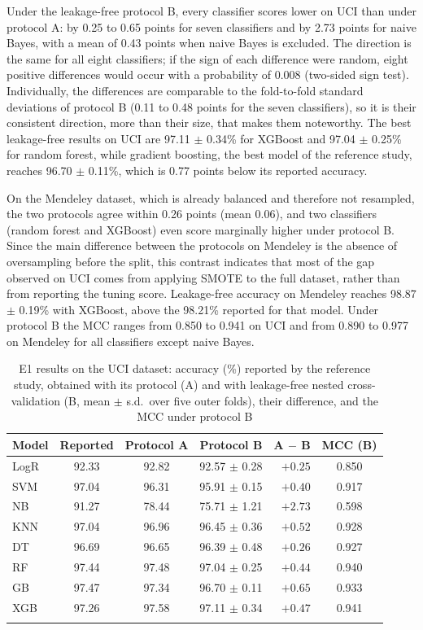 \documentclass[pdflatex,sn-mathphys-num]{sn-jnl}%
\theoremstyle{thmstyleone}%
\theoremstyle{thmstyletwo}%
\theoremstyle{thmstylethree}%
\begin{document}
Under the leakage-free protocol B, every classifier scores lower on UCI than under protocol A: by 0.25 to 0.65 points for seven classifiers and by 2.73 points for naive Bayes, with a mean of 0.43 points when naive Bayes is excluded. The direction is the same for all eight classifiers; if the sign of each difference were random, eight positive differences would occur with a probability of 0.008 (two-sided sign test). Individually, the differences are comparable to the fold-to-fold standard deviations of protocol B (0.11 to 0.48 points for the seven classifiers), so it is their consistent direction, more than their size, that makes them noteworthy. The best leakage-free results on UCI are 97.11 $\pm$ 0.34\% for XGBoost and 97.04 $\pm$ 0.25\% for random forest, while gradient boosting, the best model of the reference study, reaches 96.70 $\pm$ 0.11\%, which is 0.77 points below its reported accuracy.

On the Mendeley dataset, which is already balanced and therefore not resampled, the two protocols agree within 0.26 points (mean 0.06), and two classifiers (random forest and XGBoost) even score marginally higher under protocol B. Since the main difference between the protocols on Mendeley is the absence of oversampling before the split, this contrast indicates that most of the gap observed on UCI comes from applying SMOTE to the full dataset, rather than from reporting the tuning score. Leakage-free accuracy on Mendeley reaches 98.87 $\pm$ 0.19\% with XGBoost, above the 98.21\% reported for that model. Under protocol B the MCC ranges from 0.850 to 0.941 on UCI and from 0.890 to 0.977 on Mendeley for all classifiers except naive Bayes.

\begin{table}[htbp]
\caption{E1 results on the UCI dataset: accuracy (\%) reported by the reference study, obtained with its protocol (A) and with leakage-free nested cross-validation (B, mean $\pm$ s.d.\ over five outer folds), their difference, and the MCC under protocol B}\label{tab:e1-uci}%
\begin{tabular}{@{}lcccrc@{}}
\toprule
Model & Reported & Protocol A & Protocol B & A $-$ B & MCC (B) \\
\midrule
LogR & 92.33 & 92.82 & 92.57 $\pm$ 0.28 & $+0.25$ & 0.850 \\
SVM & 97.04 & 96.31 & 95.91 $\pm$ 0.15 & $+0.40$ & 0.917 \\
NB & 91.27 & 78.44 & 75.71 $\pm$ 1.21 & $+2.73$ & 0.598 \\
KNN & 97.04 & 96.96 & 96.45 $\pm$ 0.36 & $+0.52$ & 0.928 \\
DT & 96.69 & 96.65 & 96.39 $\pm$ 0.48 & $+0.26$ & 0.927 \\
RF & 97.44 & 97.48 & 97.04 $\pm$ 0.25 & $+0.44$ & 0.940 \\
GB & 97.47 & 97.34 & 96.70 $\pm$ 0.11 & $+0.65$ & 0.933 \\
XGB & 97.26 & 97.58 & 97.11 $\pm$ 0.34 & $+0.47$ & 0.941 \\
\botrule
\end{tabular}
\end{table}
\end{document}
